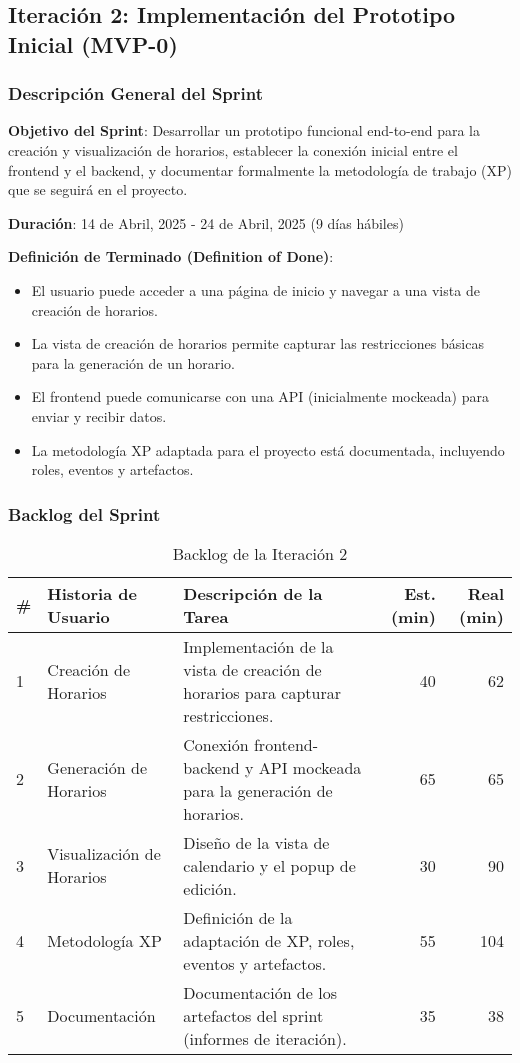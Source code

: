 \subsection{Iteración 2: Implementación del Prototipo Inicial (MVP-0)}

\subsubsection{Descripción General del Sprint}

\textbf{Objetivo del Sprint}: Desarrollar un prototipo funcional end-to-end para la creación y visualización de horarios, establecer la conexión inicial entre el frontend y el backend, y documentar formalmente la metodología de trabajo (XP) que se seguirá en el proyecto.

\textbf{Duración}: 14 de Abril, 2025 - 24 de Abril, 2025 (9 días hábiles)

\textbf{Definición de Terminado (Definition of Done)}:
\begin{itemize}
    \item El usuario puede acceder a una página de inicio y navegar a una vista de creación de horarios.
    \item La vista de creación de horarios permite capturar las restricciones básicas para la generación de un horario.
    \item El frontend puede comunicarse con una API (inicialmente mockeada) para enviar y recibir datos.
    \item La metodología XP adaptada para el proyecto está documentada, incluyendo roles, eventos y artefactos.
\end{itemize}

\subsubsection{Backlog del Sprint}

\begin{table}[H]
\caption{Backlog de la Iteración 2}
\label{tab:iteration-2-backlog}
\begin{tabularx}{\textwidth}{@{}llXrr@{}}
\toprule
\textbf{\#} & \textbf{Historia de Usuario} & \textbf{Descripción de la Tarea} & \textbf{Est. (min)} & \textbf{Real (min)} \\
\midrule
    1 & Creación de Horarios & Implementación de la vista de creación de horarios para capturar restricciones. & 40 & 62 \\
    2 & Generación de Horarios & Conexión frontend-backend y API mockeada para la generación de horarios. & 65 & 65 \\
    3 & Visualización de Horarios & Diseño de la vista de calendario y el popup de edición. & 30 & 90 \\
    4 & Metodología XP & Definición de la adaptación de XP, roles, eventos y artefactos. & 55 & 104 \\
    5 & Documentación & Documentación de los artefactos del sprint (informes de iteración). & 35 & 38 \\
\bottomrule
\end{tabularx}
\end{table}

